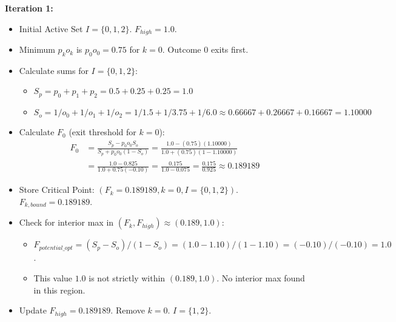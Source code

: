 \documentclass[11pt, letterpaper]{article}
\theoremstyle{definition}
\begin{document}
\textbf{Iteration 1:}
\begin{itemize}
    \item Initial Active Set $I = \{0, 1, 2\}$. $F_{high} = 1.0$.
    \item Minimum $p_k o_k$ is $p_0 o_0 = 0.75$ for $k=0$. Outcome 0 exits first.
    \item Calculate sums for $I=\{0, 1, 2\}$:
        \begin{itemize}
            \item $S_p = p_0+p_1+p_2 = 0.5 + 0.25 + 0.25 = 1.0$
            \item $S_o = 1/o_0 + 1/o_1 + 1/o_2 = 1/1.5 + 1/3.75 + 1/6.0 \approx 0.66667 + 0.26667 + 0.16667 = 1.10000$
        \end{itemize}
    \item Calculate $F_0$ (exit threshold for $k=0$):
        \begin{align*}
           F_0 &= \frac{S_p - p_0 o_0 S_o}{S_p + p_0 o_0 (1 - S_o)} = \frac{1.0 - (0.75)(1.10000)}{1.0 + (0.75)(1 - 1.10000)} \\
               &= \frac{1.0 - 0.825}{1.0 + 0.75(-0.10)} = \frac{0.175}{1.0 - 0.075} = \frac{0.175}{0.925} \approx 0.189189
        \end{align*}
    \item Store Critical Point: $(F_k=0.189189, k=0, I=\{0, 1, 2\})$. $F_{k,bound}=0.189189$.
    \item Check for interior max in $(F_k, F_{high}) \approx (0.189, 1.0)$:
        \begin{itemize}
            \item $F_{potential\_opt} = (S_p - S_o) / (1 - S_o) = (1.0 - 1.10) / (1 - 1.10) = (-0.10) / (-0.10) = 1.0$.
            \item This value $1.0$ is not strictly within $(0.189, 1.0)$. No interior max found in this region.
        \end{itemize}
    \item Update $F_{high} = 0.189189$. Remove $k=0$. $I = \{1, 2\}$.
\end{itemize}
\end{document}
